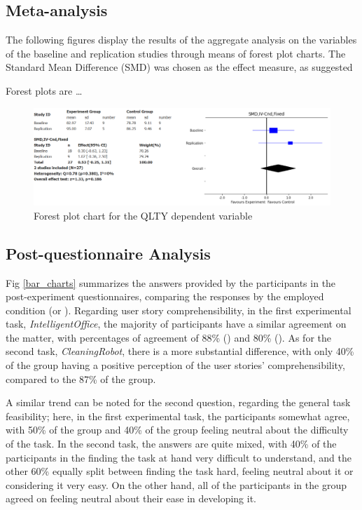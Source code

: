 \subsection{Meta-analysis}
The following figures display the results of the aggregate analysis on the variables of the baseline and replication studies through means of forest plot charts. The Standard Mean Difference (SMD) was chosen as the effect measure, as suggested 


Forest plots are \dots
\begin{figure}[H]
    \centering
    \includegraphics[width=\linewidth]{figures/forest_plots/QLTY.png}
    \caption{Forest plot chart for the QLTY dependent variable}
    \label{forest_plot}
\end{figure}



\subsection{Post-questionnaire Analysis}
Fig \ref{bar_charts} summarizes the answers provided by the participants in the post-experiment questionnaires, comparing the responses by the employed condition (\tdd or \notdd).
Regarding user story comprehensibility, in the first experimental task, \textit{IntelligentOffice}, the majority of participants have a similar agreement on the matter, with percentages of agreement of 88\% (\tdd) and 80\% (\notdd). As for the second task, \textit{CleaningRobot}, there is a more substantial difference, with only 40\% of the \tdd group having a positive perception of the user stories' comprehensibility, compared to the 87\% of the \notdd group.

A similar trend can be noted for the second question, regarding the general task feasibility; here, in the first experimental task, the participants somewhat agree, with 50\% of the \tdd group and 40\% of the \notdd group feeling neutral about the difficulty of the task. In the second task, the answers are quite mixed, with 40\% of the participants in the \tdd finding the task at hand very difficult to understand, and the other 60\% equally split between finding the task hard, feeling neutral about it or considering it very easy.  On the other hand, all of the participants in the \notdd group agreed on feeling neutral about their ease in developing it.

